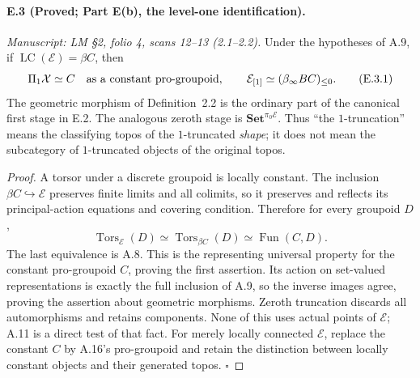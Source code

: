 \paragraph{E.3 (Proved; Part E(b), the level-one identification).}
\textit{Manuscript: LM \S2, folio 4, scans 12--13 (2.1--2.2).}
Under the hypotheses of A.9, if $\operatorname{LC}(\mathcal E)=\beta C$, then
\[
 \Pi_1\mathcal X\simeq C\quad\hbox{as a constant pro-groupoid},
 \qquad
 \mathcal E_{[1]}\simeq(\beta_\infty BC)_{\le0}.
                                                        \tag{E.3.1}
\]
The geometric morphism of Definition~2.2 is the ordinary part of the canonical first stage in E.2. The analogous zeroth stage is $\mathbf{Set}^{\pi_0\mathcal E}$. Thus ``the $1$-truncation'' means the classifying topos of the $1$-truncated \emph{shape}; it does not mean the subcategory of $1$-truncated objects of the original topos.
\begin{proof}
A torsor under a discrete groupoid is locally constant. The inclusion $\beta C\hookrightarrow\mathcal E$ preserves finite limits and all colimits, so it preserves and reflects its principal-action equations and covering condition. Therefore for every groupoid $D$,
\[
 \operatorname{Tors}_{\mathcal E}(D)
     \simeq\operatorname{Tors}_{\beta C}(D)
     \simeq\operatorname{Fun}(C,D).
\]
The last equivalence is A.8. This is the representing universal property for the constant pro-groupoid $C$, proving the first assertion. Its action on set-valued representations is exactly the full inclusion of A.9, so the inverse images agree, proving the assertion about geometric morphisms. Zeroth truncation discards all automorphisms and retains components. None of this uses actual points of $\mathcal E$; A.11 is a direct test of that fact. For merely locally connected $\mathcal E$, replace the constant $C$ by A.16's pro-groupoid and retain the distinction between locally constant objects and their generated topos. \hfill$\square$
\end{proof}

